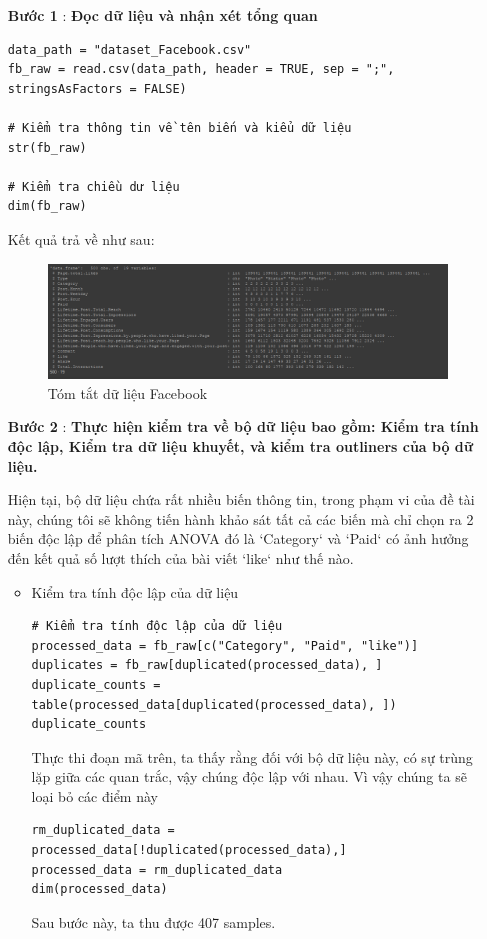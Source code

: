\begin{itemize}
    \item [\textbf{Bước 1}]: \textbf{Đọc dữ liệu và nhận xét tổng quan}
    \newpage
    \begin{lstlisting}
data_path = "dataset_Facebook.csv"
fb_raw = read.csv(data_path, header = TRUE, sep = ";", stringsAsFactors = FALSE)

# Kiểm tra thông tin về tên biến và kiểu dữ liệu
str(fb_raw)

# Kiểm tra chiều dư liệu
dim(fb_raw)
    \end{lstlisting}

    Kết quả trả về như sau:
    \begin{figure}[H]
        \centering
        \includegraphics[width=0.8\linewidth]{part23_figures/01.png}
        \caption{Tóm tắt dữ liệu Facebook}
        \label{fig:Tóm tắt dữ liệu Facebook}
    \end{figure}
    \item[\textbf{Bước 2}]: \textbf{Thực hiện kiểm tra về bộ dữ liệu bao gồm: Kiểm tra tính độc lập, Kiểm tra dữ liệu khuyết, và kiểm tra outliners của bộ dữ liệu.}
    
    Hiện tại, bộ dữ liệu chứa rất nhiều biến thông tin, trong phạm vi của đề tài này, chúng tôi sẽ không tiến hành khảo sát tất cả các biến mà chỉ chọn ra 2 biến độc lập để phân tích ANOVA đó là `Category`  và `Paid` có ảnh hưởng đến kết quả số lượt thích của bài viết `like` như thế nào.
    
        \begin{itemize}
            \item Kiểm tra tính độc lập của dữ liệu
                \begin{lstlisting}              
# Kiểm tra tính độc lập của dữ liệu
processed_data = fb_raw[c("Category", "Paid", "like")]
duplicates = fb_raw[duplicated(processed_data), ]
duplicate_counts = table(processed_data[duplicated(processed_data), ])
duplicate_counts
                \end{lstlisting}
                \newpage
                Thực thi đoạn mã trên, ta thấy rằng đối với bộ dữ liệu này, có sự trùng lặp giữa các quan trắc, vậy chúng độc lập với nhau. Vì vậy chúng ta sẽ loại bỏ các điểm này
                \begin{lstlisting}
rm_duplicated_data = processed_data[!duplicated(processed_data),]
processed_data = rm_duplicated_data
dim(processed_data)
                \end{lstlisting}
    Sau bước này, ta thu được 407 samples.


\end{itemize}
\end{itemize}
